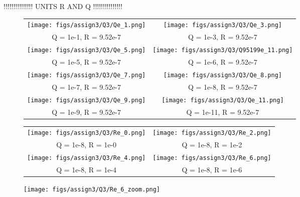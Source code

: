 \documentclass[a4paper]{article}
\newcommand{\newpar}{\vspace{.3cm}\noindent}
\begin{document}
\newpar
!!!!!!!!!!!!!!! UNITS R AND Q !!!!!!!!!!!!!!!

\begin{figure}[H]
\begin{adjustwidth}{-3cm}{-3cm}
\centering
\begin{tabular}{cc}
  \texttt{[image: figs/assign3/Q3/Qe\_1.png]} &   \texttt{[image: figs/assign3/Q3/Qe\_3.png]} \\
  Q = 1e-1, R = 9.52e-7 & Q = 1e-3, R = 9.52e-7 \\[8pt]
  \texttt{[image: figs/assign3/Q3/Qe\_5.png]} & \texttt{[image: figs/assign3/Q3/Q95199e\_11.png]} \\
  Q = 1e-5, R = 9.52e-7 & Q = 1e-6, R = 9.52e-7 \\[8pt]
  \texttt{[image: figs/assign3/Q3/Qe\_7.png]} & \texttt{[image: figs/assign3/Q3/Qe\_8.png]} \\
  Q = 1e-7, R = 9.52e-7 & Q = 1e-8, R = 9.52e-7 \\[8pt]
  \texttt{[image: figs/assign3/Q3/Qe\_9.png]} & \texttt{[image: figs/assign3/Q3/Qe\_11.png]}\\
  Q = 1e-9, R = 9.52e-7 & Q = 1e-11, R = 9.52e-7
\end{tabular}
\end{adjustwidth}
\label{fig:QcteR}
\end{figure}


\begin{figure}[H]
\begin{adjustwidth}{-3cm}{-3cm}
\centering
\begin{tabular}{cc}
  \texttt{[image: figs/assign3/Q3/Re\_0.png]} &   \texttt{[image: figs/assign3/Q3/Re\_2.png]} \\
  Q = 1e-8, R = 1e-0 & Q = 1e-8, R = 1e-2 \\[8pt]
 \texttt{[image: figs/assign3/Q3/Re\_4.png]} &   \texttt{[image: figs/assign3/Q3/Re\_6.png]} \\
 Q = 1e-8, R = 1e-4 & Q = 1e-8, R = 1e-6 \\[8pt]
\end{tabular}
\end{adjustwidth}
\label{fig:cteQR}
\end{figure}

\begin{figure}[H]
    \centering
    \texttt{[image: figs/assign3/Q3/Re\_6\_zoom.png]}
    \label{fig:zoomconsistent}
\end{figure}
\end{document}
